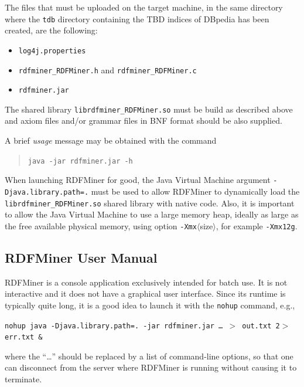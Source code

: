 \documentclass[a4paper]{article}
\newcounter{ex}
\begin{document}
The files that must be uploaded on the target machine, in the same directory
where the \texttt{tdb} directory containing the TBD indices of DBpedia has been created,
are the following:
\begin{itemize}
  \item \texttt{log4j.properties}
  \item \texttt{rdfminer\_RDFMiner.h} and \texttt{rdfminer\_RDFMiner.c}
  \item \texttt{rdfminer.jar}
\end{itemize}
The shared library \texttt{librdfminer\_RDFMiner.so} must be build as described above
and axiom files and/or grammar files in BNF format should be also supplied.

A brief \emph{usage} message may be obtained with the command
\begin{quotation}
  \texttt{java -jar rdfminer.jar -h}
\end{quotation}

When launching RDFMiner for good,
the Java Virtual Machine argument \texttt{-Djava.library.path=.} must be used to allow RDFMiner to
dynamically load the \texttt{librdfminer\_RDFMiner.so} shared library with native code.
Also, it is important to allow the Java Virtual Machine to use a large memory heap,
ideally as large as the free available physical memory,
using option \texttt{-Xmx}$\langle$size$\rangle$, for example \texttt{-Xmx12g}.

\subsection{RDFMiner User Manual}

RDFMiner is a console application exclusively intended for batch use.
It is not interactive and it does not have a graphical user interface.
Since its runtime is typically quite long, it is a good idea to launch it with
the \texttt{nohup} command, e.g.,
\begin{center}
  \texttt{nohup java -Djava.library.path=.\ -jar rdfminer.jar \dots\ $>$ out.txt 2$>$ err.txt \&}
\end{center}
where the ``\dots'' should be replaced by a list of command-line options, so that
one can disconnect from the server where RDFMiner is running without causing it to terminate.
\end{document}
